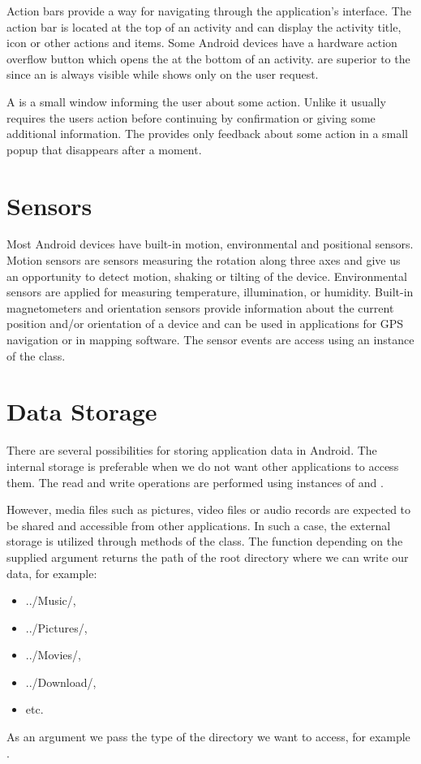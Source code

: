 Action bars provide a way for navigating through the application's interface. %
The action bar is located at the top of an activity and can display the activity title, icon or other actions and items.
Some Android devices have a hardware action overflow button which opens the  at the bottom of an activity. %
 are superior to the  since an  is always visible while  shows only on the user request.

A  is a small window informing the user about some action. 
Unlike  it usually requires the users action before continuing by confirmation or giving some additional information.
The  provides only feedback about some action in a small popup that disappears after a moment.

\section{Sensors}

Most Android devices have built-in motion, environmental and positional sensors.
Motion sensors are sensors measuring the rotation along three axes and give us an opportunity to detect motion, shaking or tilting of the device. 
Environmental sensors are applied for measuring temperature, illumination, or humidity.
Built-in magnetometers and orientation sensors provide information about the current position and/or orientation of a device and can be used in applications for GPS navigation or in mapping software. 
The sensor events are access using an instance of the  class.

\section{Data Storage}

There are several possibilities for storing application data in Android. 
The internal storage is preferable when we do not want other applications to access them. 
The read and write operations are performed using instances of  and .

However, media files such as pictures, video files or audio records are expected to be shared and accessible from other applications.
In such a case, the external storage is utilized through methods of the  class.
The function  depending on the supplied argument returns the path of the root directory where we can write our data, for example: 
\begin{itemize}
\item{../Music/,}
\item{../Pictures/,}
\item{../Movies/,}
\item{../Download/,}
\item{etc.}
\end{itemize}
As an argument we pass the type of the directory we want to access, for example .

